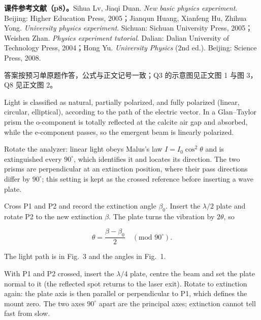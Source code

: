 \documentclass[11pt]{ctexart}
\begin{document}
\flowerrule

{\small\color{inkgray}
\textbf{课件参考文献（p8）。}Sihua Lv, Jiaqi Duan. \emph{New basic physics experiment}. Beijing: Higher Education Press, 2005；Jianqun Huang, Xianfeng Hu, Zhihua Yong. \emph{University physics experiment}. Sichuan: Sichuan University Press, 2005；Weishen Zhan. \emph{Physics experiment tutorial}. Dalian: Dalian University of Technology Press, 2004；Hong Yu. \emph{University Physics} (2nd ed.). Beijing: Science Press, 2008.}


{\small 答案按预习单原题作答，公式与正文记号一致；Q3 的示意图见正文图 1 与图 3，Q8 见正文图 2。}


Light is classified as natural, partially polarized, and fully polarized (linear, circular, elliptical), according to the path of the electric vector. In a Glan--Taylor prism the o-component is totally reflected at the calcite air gap and absorbed, while the e-component passes, so the emergent beam is linearly polarized.


Rotate the analyzer: linear light obeys Malus's law $I=I_0\cos^2\theta$ and is extinguished every $90^\circ$, which identifies it and locates its direction. The two prisms are perpendicular at an extinction position, where their pass directions differ by $90^\circ$; this setting is kept as the crossed reference before inserting a wave plate.


Cross P1 and P2 and record the extinction angle $\beta_0$. Insert the $\lambda/2$ plate and rotate P2 to the new extinction $\beta$. The plate turns the vibration by $2\theta$, so

\[ \theta=\frac{\beta-\beta_0}{2}\quad(\text{mod }90^\circ). \]

The light path is in Fig.~3 and the angles in Fig.~1.


With P1 and P2 crossed, insert the $\lambda/4$ plate, centre the beam and set the plate normal to it (the reflected spot returns to the laser exit). Rotate to extinction again: the plate axis is then parallel or perpendicular to P1, which defines the mount zero. The two axes $90^\circ$ apart are the principal axes; extinction cannot tell fast from slow.
\end{document}
